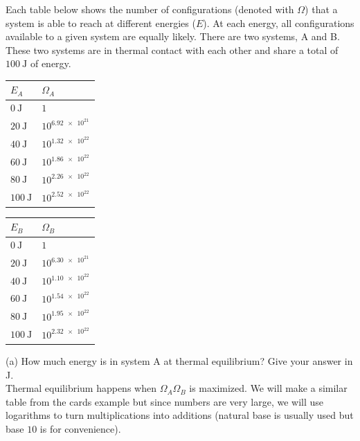 \documentclass[12pt, a4paper]{article}
\newcounter{exa}
\begin{document}
\begin{texample}
Each table below shows the number of configurations (denoted with $\Omega$) that a system is able to reach at different energies ($E$). At each energy, all configurations available to a given system are equally likely. There are two systems, A and B. These two systems are in thermal contact with each other and share a total of $\SI{100}{\joule}$ of energy. \\

\begin{center}
\begin{tabular}{l|l}
  $E_A$ & $\Omega_A$ \\
  \hline
  $\SI{0}{\joule}$ & $1$ \\
  \hline
  $\SI{20}{\joule}$ & $10^{\num{6.92e21}}$ \\
  \hline
  $\SI{40}{\joule}$ & $10^{\num{1.32e22}}$ \\
  \hline
  $\SI{60}{\joule}$ & $10^{\num{1.86e22}}$ \\
  \hline
  $\SI{80}{\joule}$ & $10^{\num{2.26e22}}$ \\
  \hline
  $\SI{100}{\joule}$ & $10^{\num{2.52e22}}$
\end{tabular}
\quad
\begin{tabular}{l|l}
  $E_B$ & $\Omega_B$ \\
  \hline
  $\SI{0}{\joule}$ & $1$ \\
  \hline
  $\SI{20}{\joule}$ & $10^{\num{6.30e21}}$ \\
  \hline
  $\SI{40}{\joule}$ & $10^{\num{1.10e22}}$ \\
  \hline
  $\SI{60}{\joule}$ & $10^{\num{1.54e22}}$ \\
  \hline
  $\SI{80}{\joule}$ & $10^{\num{1.95e22}}$ \\
  \hline
  $\SI{100}{\joule}$ & $10^{\num{2.32e22}}$
\end{tabular}
\end{center}

(a) How much energy is in system A at thermal equilibrium? Give your answer in J. \\

Thermal equilibrium happens when $\Omega_A\Omega_B$ is maximized. We will make a similar table from the cards example but since numbers are very large, we will use logarithms to turn multiplications into additions (natural base is usually used but base $10$ is for convenience).


\end{texample}
\end{document}
